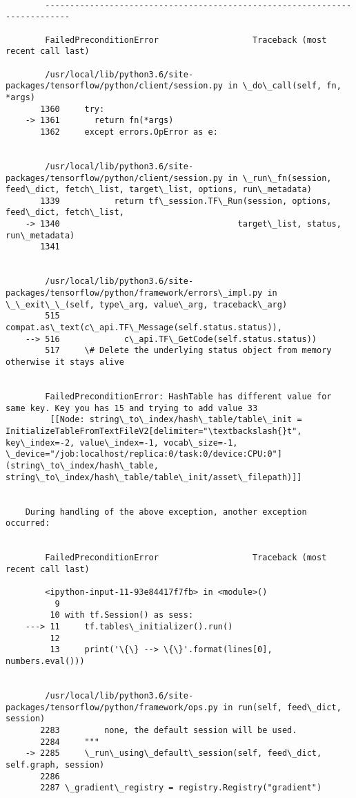 \documentclass[11pt]{article}
\begin{document}
    \begin{Verbatim}[commandchars=\\\{\}]

        ---------------------------------------------------------------------------

        FailedPreconditionError                   Traceback (most recent call last)

        /usr/local/lib/python3.6/site-packages/tensorflow/python/client/session.py in \_do\_call(self, fn, *args)
       1360     try:
    -> 1361       return fn(*args)
       1362     except errors.OpError as e:


        /usr/local/lib/python3.6/site-packages/tensorflow/python/client/session.py in \_run\_fn(session, feed\_dict, fetch\_list, target\_list, options, run\_metadata)
       1339           return tf\_session.TF\_Run(session, options, feed\_dict, fetch\_list,
    -> 1340                                    target\_list, status, run\_metadata)
       1341 


        /usr/local/lib/python3.6/site-packages/tensorflow/python/framework/errors\_impl.py in \_\_exit\_\_(self, type\_arg, value\_arg, traceback\_arg)
        515             compat.as\_text(c\_api.TF\_Message(self.status.status)),
    --> 516             c\_api.TF\_GetCode(self.status.status))
        517     \# Delete the underlying status object from memory otherwise it stays alive


        FailedPreconditionError: HashTable has different value for same key. Key you has 15 and trying to add value 33
    	 [[Node: string\_to\_index/hash\_table/table\_init = InitializeTableFromTextFileV2[delimiter="\textbackslash{}t", key\_index=-2, value\_index=-1, vocab\_size=-1, \_device="/job:localhost/replica:0/task:0/device:CPU:0"](string\_to\_index/hash\_table, string\_to\_index/hash\_table/table\_init/asset\_filepath)]]

        
    During handling of the above exception, another exception occurred:


        FailedPreconditionError                   Traceback (most recent call last)

        <ipython-input-11-93e84417f7fb> in <module>()
          9 
         10 with tf.Session() as sess:
    ---> 11     tf.tables\_initializer().run()
         12 
         13     print('\{\} --> \{\}'.format(lines[0], numbers.eval()))


        /usr/local/lib/python3.6/site-packages/tensorflow/python/framework/ops.py in run(self, feed\_dict, session)
       2283         none, the default session will be used.
       2284     """
    -> 2285     \_run\_using\_default\_session(self, feed\_dict, self.graph, session)
       2286 
       2287 \_gradient\_registry = registry.Registry("gradient")



\end{Verbatim}
\end{document}
